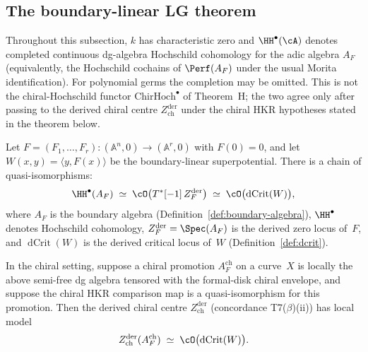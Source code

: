 \subsection{The boundary-linear LG theorem}

Throughout this subsection, \(k\) has characteristic zero and
\(\HH^\bullet(\cA)\) denotes completed continuous dg-algebra Hochschild
cohomology for the adic algebra \(A_F\) (equivalently, the Hochschild
cochains of \(\Perf(A_F)\) under the usual Morita identification). For
polynomial germs the completion may be omitted. This is not the
chiral-Hochschild functor
\(\mathrm{ChirHoch}^\bullet\) of Theorem~H; the two agree only after
passing to the derived chiral centre
\(Z^{\mathrm{der}}_{\mathrm{ch}}\) under the chiral HKR hypotheses
stated in the theorem below.

\begin{theorem}
\label{thm:boundary-linear-lg}
Let $F = (F_1, \ldots, F_r)\colon (\mathbb{A}^n, 0) \to (\mathbb{A}^r, 0)$
with $F(0) = 0$, and let $W(x,y) = \langle y, F(x) \rangle$ be
the boundary-linear superpotential. There is a chain of
quasi-isomorphisms:
\begin{equation}\label{eq:boundary-linear-lg-chain}
\HH^\bullet(A_F)
\;\simeq\;
\cO\bigl(T^*[-1]\, Z_F^{\mathrm{der}}\bigr)
\;\simeq\;
\cO\bigl(\operatorname{dCrit}(W)\bigr),
\end{equation}
where $A_F$ is the boundary algebra
\textup{(}Definition~\textup{\ref{def:boundary-algebra})},
$\HH^\bullet$ denotes Hochschild cohomology,
$Z_F^{\mathrm{der}} = \Spec(A_F)$ is the derived zero locus
of~$F$, and $\operatorname{dCrit}(W)$ is the derived critical
locus of~$W$
\textup{(}Definition~\textup{\ref{def:dcrit})}.

In the chiral setting, suppose a chiral promotion
$A_F^{\mathrm{ch}}$ on a curve~$X$ is locally the above semi-free
dg algebra tensored with the formal-disk chiral envelope, and suppose
the chiral HKR comparison map is a quasi-isomorphism for this
promotion. Then the derived chiral centre
$Z^{\mathrm{der}}_{\mathrm{ch}}$ (concordance T7($\beta$)(ii)) has
local model
\[
Z^{\mathrm{der}}_{\mathrm{ch}}(A_F^{\mathrm{ch}})
\;\simeq\;
\cO\bigl(\operatorname{dCrit}(W)\bigr).
\]
\end{theorem}

